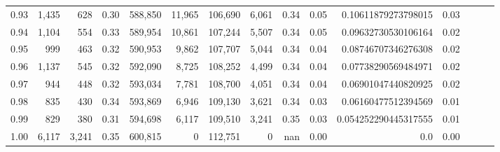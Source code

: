 \begin{tabular}{rrrrrrrrrrrrrrr}
0.93 &   1,435 &    628 &  0.30 &  588,850 &   11,965 &  106,690 &    6,061 &  0.34 &  0.05 &   0.10611879273798015 &      0.03 \\
0.94 &   1,104 &    554 &  0.33 &  589,954 &   10,861 &  107,244 &    5,507 &  0.34 &  0.05 &   0.09632730530106164 &      0.02 \\
0.95 &     999 &    463 &  0.32 &  590,953 &    9,862 &  107,707 &    5,044 &  0.34 &  0.04 &   0.08746707346276308 &      0.02 \\
0.96 &   1,137 &    545 &  0.32 &  592,090 &    8,725 &  108,252 &    4,499 &  0.34 &  0.04 &   0.07738290569484971 &      0.02 \\
0.97 &     944 &    448 &  0.32 &  593,034 &    7,781 &  108,700 &    4,051 &  0.34 &  0.04 &   0.06901047440820925 &      0.02 \\
0.98 &     835 &    430 &  0.34 &  593,869 &    6,946 &  109,130 &    3,621 &  0.34 &  0.03 &   0.06160477512394569 &      0.01 \\
0.99 &     829 &    380 &  0.31 &  594,698 &    6,117 &  109,510 &    3,241 &  0.35 &  0.03 &  0.054252290445317555 &      0.01 \\
1.00 &   6,117 &  3,241 &  0.35 &  600,815 &        0 &  112,751 &        0 &   nan &  0.00 &                   0.0 &      0.00 \\
\bottomrule
\end{tabular}
